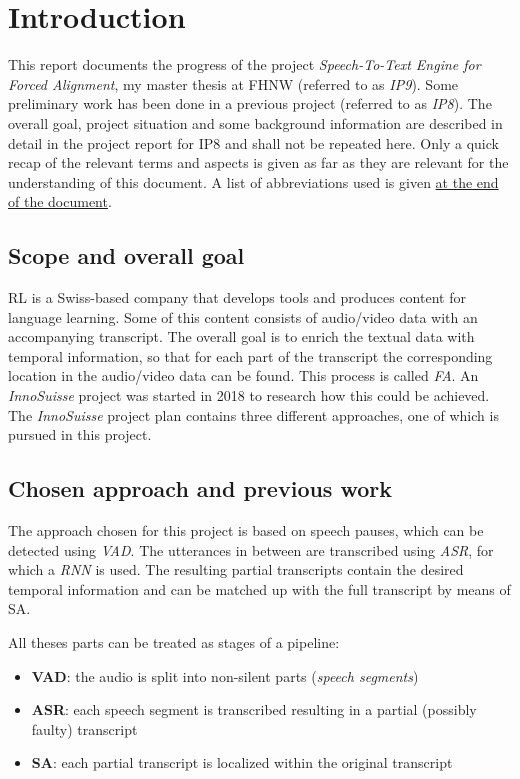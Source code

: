 \section{Introduction}\label{intro}
This report documents the progress of the project \textit{Speech-To-Text Engine for Forced Alignment}, my master thesis at \ac{FHNW} (referred to as \textit{IP9}). Some preliminary work has been done in a previous project (referred to as \textit{IP8}). The overall goal, project situation and some background information are described in detail in the project report for IP8 and shall not be repeated here. Only a quick recap of the relevant terms and aspects is given as far as they are relevant for the understanding of this document. A list of abbreviations used is given \hyperref[acronyms]{at the end of the document}. 

\subsection{Scope and overall goal}
\ac{RL} is a Swiss-based company that develops tools and produces content for language learning. Some of this content consists of audio/video data with an accompanying transcript. The overall goal is to enrich the textual data with temporal information, so that for each part of the transcript the corresponding location in the audio/video data can be found. This process is called \textit{\ac{FA}}. An \textit{InnoSuisse} project was started in 2018 to research how this could be achieved. The \textit{InnoSuisse} project plan contains three different approaches, one of which is pursued in this project.

\subsection{Chosen approach and previous work}
The approach chosen for this project is based on speech pauses, which can be detected using \textit{\ac{VAD}}. The utterances in between are transcribed using \textit{\ac{ASR}}, for which a \textit{\ac{RNN}} is used. The resulting partial transcripts contain the desired temporal information and can be matched up with the full transcript by means of \ac{SA}.

All theses parts can be treated as stages of a pipeline:

\begin{itemize}
	\item \textbf{\ac{VAD}}: the audio is split into non-silent parts (\textit{speech segments})
	\item \textbf{\ac{ASR}}: each speech segment is transcribed resulting in a partial (possibly faulty) transcript
	\item \textbf{\ac{SA}}: each partial transcript is localized within the original transcript	
\end{itemize}

